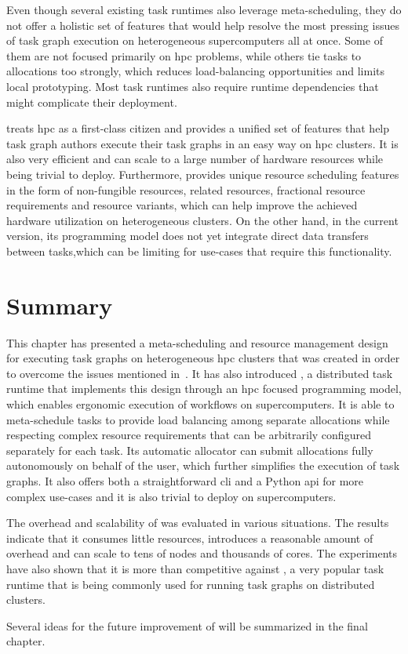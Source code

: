Even though several existing task runtimes also leverage meta-scheduling, they do not offer a
holistic set of features that would help resolve the most pressing issues of task graph execution
on heterogeneous supercomputers all at once. Some of them are not focused primarily on
\gls{hpc} problems, while others tie tasks to allocations too strongly, which reduces
load-balancing opportunities and limits local prototyping. Most task runtimes also require runtime
dependencies that might complicate their deployment.

\hyperqueue{} treats \gls{hpc} as a first-class citizen and provides a
unified set of features that help task graph authors execute their task graphs in an easy way on
\gls{hpc} clusters. It is also very efficient and can scale to a large number of
hardware resources while being trivial to deploy. Furthermore, \hyperqueue{} provides
unique resource scheduling features in the form of non-fungible resources, related resources,
fractional resource requirements and resource variants, which can help improve the achieved
hardware utilization on heterogeneous clusters. On the other hand, in the current version, its
programming model does not yet integrate direct data transfers between tasks,which can be limiting
for use-cases that require this functionality.

\section*{Summary}
This chapter has presented a meta-scheduling and resource management design for executing task
graphs on heterogeneous \gls{hpc} clusters that was created in order to overcome the
issues mentioned in~. It has also introduced \hyperqueue{}, a
distributed task runtime that implements this design through an \gls{hpc} focused
programming model, which enables ergonomic execution of workflows on supercomputers. It is able to
meta-schedule tasks to provide load balancing among separate allocations while respecting complex
resource requirements that can be arbitrarily configured separately for each task. Its automatic
allocator can submit allocations fully autonomously on behalf of the user, which further simplifies
the execution of \hyperqueue{} task graphs. It also offers both a straightforward
\gls{cli} and a Python \gls{api} for more complex use-cases and it is
also trivial to deploy on supercomputers.

The overhead and scalability of \hyperqueue{} was evaluated in various situations. The
results indicate that it consumes little resources, introduces a reasonable amount of overhead and
can scale to tens of nodes and thousands of cores. The experiments have also shown that it is more
than competitive against \dask{}, a very popular task runtime that is being
commonly used for running task graphs on distributed clusters.

Several ideas for the future improvement of \hyperqueue{} will be summarized in the final
chapter.
